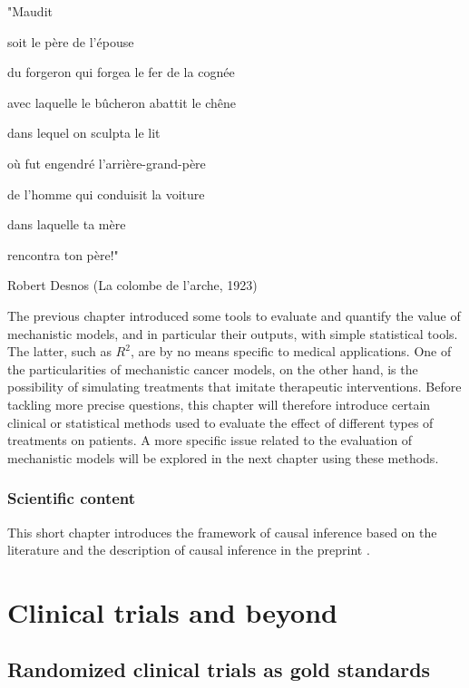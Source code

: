 \documentclass[a4paper,12pt,twoside,onecolumn,openright,final,oldfontcommands]{memoir}
\newcommand{\initial}[1]{
	\lettrine[lines=3,lhang=0.33,nindent=0em]{
		\color{gray}
     		{\textsc{#1}}}{}}
\let\BeginKnitrBlock\begin \let\EndKnitrBlock\end
\begin{document}
\epigraph{"Maudit

soit le père de l'épouse

du forgeron qui forgea le fer de la cognée

avec laquelle le bûcheron abattit le chêne

dans lequel on sculpta le lit

où fut engendré l'arrière-grand-père

de l'homme qui conduisit la voiture

dans laquelle ta mère

rencontra ton père!"}{Robert Desnos (La colombe de l'arche, 1923)}

\initial{T}he previous chapter introduced some tools to evaluate and
quantify the value of mechanistic models, and in particular their
outputs, with simple statistical tools. The latter, such as \(R^2\), are
by no means specific to medical applications. One of the particularities
of mechanistic cancer models, on the other hand, is the possibility of
simulating treatments that imitate therapeutic interventions. Before
tackling more precise questions, this chapter will therefore introduce
certain clinical or statistical methods used to evaluate the effect of
different types of treatments on patients. A more specific issue related
to the evaluation of mechanistic models will be explored in the next
chapter using these methods.

\BeginKnitrBlock{summarybox}
\subsubsection*{Scientific content}\label{scientific-content-5}

This short chapter introduces the framework of causal inference based on
the literature and the description of causal inference in the preprint
\citet{beal2020causal}.
\EndKnitrBlock{summarybox}

\newcommand{\indep}{\perp \!\!\! \perp}

\section{Clinical trials and beyond}\label{clinical-trials-and-beyond}

\subsection{Randomized clinical trials as gold
standards}\label{randomized-clinical-trials-as-gold-standards}
\end{document}
